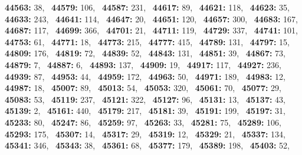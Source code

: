 \textbf{44563:} 38,\allowbreak~ 
\textbf{44579:} 106,\allowbreak~ 
\textbf{44587:} 231,\allowbreak~ 
\textbf{44617:} 89,\allowbreak~ 
\textbf{44621:} 118,\allowbreak~ 
\textbf{44623:} 35,\allowbreak~ 
\textbf{44633:} 243,\allowbreak~ 
\textbf{44641:} 114,\allowbreak~ 
\textbf{44647:} 20,\allowbreak~ 
\textbf{44651:} 120,\allowbreak~ 
\textbf{44657:} 300,\allowbreak~ 
\textbf{44683:} 167,\allowbreak~ 
\textbf{44687:} 117,\allowbreak~ 
\textbf{44699:} 366,\allowbreak~ 
\textbf{44701:} 21,\allowbreak~ 
\textbf{44711:} 119,\allowbreak~ 
\textbf{44729:} 337,\allowbreak~ 
\textbf{44741:} 101,\allowbreak~ 
\textbf{44753:} 61,\allowbreak~ 
\textbf{44771:} 18,\allowbreak~ 
\textbf{44773:} 215,\allowbreak~ 
\textbf{44777:} 415,\allowbreak~ 
\textbf{44789:} 131,\allowbreak~ 
\textbf{44797:} 15,\allowbreak~ 
\textbf{44809:} 176,\allowbreak~ 
\textbf{44819:} 72,\allowbreak~ 
\textbf{44839:} 52,\allowbreak~ 
\textbf{44843:} 131,\allowbreak~ 
\textbf{44851:} 39,\allowbreak~ 
\textbf{44867:} 73,\allowbreak~ 
\textbf{44879:} 7,\allowbreak~ 
\textbf{44887:} 6,\allowbreak~ 
\textbf{44893:} 137,\allowbreak~ 
\textbf{44909:} 19,\allowbreak~ 
\textbf{44917:} 117,\allowbreak~ 
\textbf{44927:} 236,\allowbreak~ 
\textbf{44939:} 87,\allowbreak~ 
\textbf{44953:} 44,\allowbreak~ 
\textbf{44959:} 172,\allowbreak~ 
\textbf{44963:} 50,\allowbreak~ 
\textbf{44971:} 189,\allowbreak~ 
\textbf{44983:} 12,\allowbreak~ 
\textbf{44987:} 18,\allowbreak~ 
\textbf{45007:} 89,\allowbreak~ 
\textbf{45013:} 54,\allowbreak~ 
\textbf{45053:} 320,\allowbreak~ 
\textbf{45061:} 70,\allowbreak~ 
\textbf{45077:} 29,\allowbreak~ 
\textbf{45083:} 53,\allowbreak~ 
\textbf{45119:} 237,\allowbreak~ 
\textbf{45121:} 322,\allowbreak~ 
\textbf{45127:} 96,\allowbreak~ 
\textbf{45131:} 13,\allowbreak~ 
\textbf{45137:} 43,\allowbreak~ 
\textbf{45139:} 2,\allowbreak~ 
\textbf{45161:} 440,\allowbreak~ 
\textbf{45179:} 217,\allowbreak~ 
\textbf{45181:} 39,\allowbreak~ 
\textbf{45191:} 199,\allowbreak~ 
\textbf{45197:} 31,\allowbreak~ 
\textbf{45233:} 80,\allowbreak~ 
\textbf{45247:} 86,\allowbreak~ 
\textbf{45259:} 97,\allowbreak~ 
\textbf{45263:} 33,\allowbreak~ 
\textbf{45281:} 75,\allowbreak~ 
\textbf{45289:} 106,\allowbreak~ 
\textbf{45293:} 175,\allowbreak~ 
\textbf{45307:} 14,\allowbreak~ 
\textbf{45317:} 29,\allowbreak~ 
\textbf{45319:} 12,\allowbreak~ 
\textbf{45329:} 21,\allowbreak~ 
\textbf{45337:} 134,\allowbreak~ 
\textbf{45341:} 346,\allowbreak~ 
\textbf{45343:} 38,\allowbreak~ 
\textbf{45361:} 68,\allowbreak~ 
\textbf{45377:} 179,\allowbreak~ 
\textbf{45389:} 198,\allowbreak~ 
\textbf{45403:} 52,\allowbreak~ 
